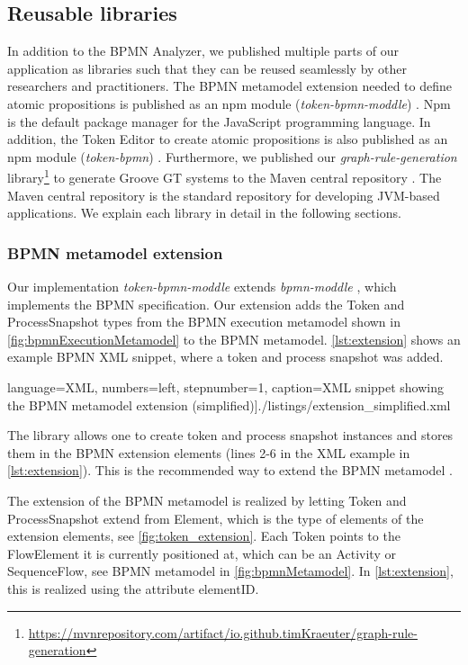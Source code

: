 \documentclass{lmcs} %
\begin{document}
\subsection{Reusable libraries}
In addition to the BPMN Analyzer, we published multiple parts of our application as libraries such that they can be reused seamlessly by other researchers and practitioners.
The BPMN metamodel extension needed to define atomic propositions is published as an npm module (\textit{token-bpmn-moddle}) \cite{timkrauterLMCS2024Artifacts2023}.
Npm is the default package manager for the JavaScript programming language.
In addition, the Token Editor to create atomic propositions is also published as an npm module (\textit{token-bpmn}) \cite{timkrauterLMCS2024Artifacts2023}.
Furthermore, we published our \textit{graph-rule-generation} library\footnote{\url{https://mvnrepository.com/artifact/io.github.timKraeuter/graph-rule-generation}} to generate Groove GT systems to the Maven central repository \cite{timkrauterLMCS2024Artifacts2023}.
The Maven central repository is the standard repository for developing JVM-based applications.
We explain each library in detail in the following sections.

\subsubsection{BPMN metamodel extension}
Our implementation \textit{token-bpmn-moddle} \cite{timkrauterLMCS2024Artifacts2023} extends \textit{bpmn-moddle} \cite{camundaservicesgmbhBpmnmoddle2023}, which implements the BPMN specification.
Our extension adds the \textsf{Token} and \textsf{ProcessSnapshot} types from the BPMN execution metamodel shown in \autoref{fig:bpmnExecutionMetamodel} to the BPMN metamodel.
\autoref{lst:extension} shows an example BPMN XML snippet, where a token and process snapshot was added.

 language=XML, numbers=left,
    stepnumber=1, caption=XML snippet showing the BPMN metamodel extension (simplified)]{./listings/extension_simplified.xml}

The library allows one to create token and process snapshot instances and stores them in the BPMN extension elements (lines 2-6 in the XML example in \autoref{lst:extension}).
This is the recommended way to extend the BPMN metamodel \cite{objectmanagementgroupBusinessProcessModel2013}.

The extension of the BPMN metamodel is realized by letting \textsf{Token} and \textsf{ProcessSnapshot} extend from \textsf{Element}, which is the type of elements of the extension elements, see \autoref{fig:token_extension}.
Each \textsf{Token} points to the \textsf{FlowElement} it is currently positioned at, which can be an \textsf{Activity} or \textsf{SequenceFlow}, see BPMN metamodel in \autoref{fig:bpmnMetamodel}.
In \autoref{lst:extension}, this is realized using the attribute \textsf{elementID}.
\end{document}
